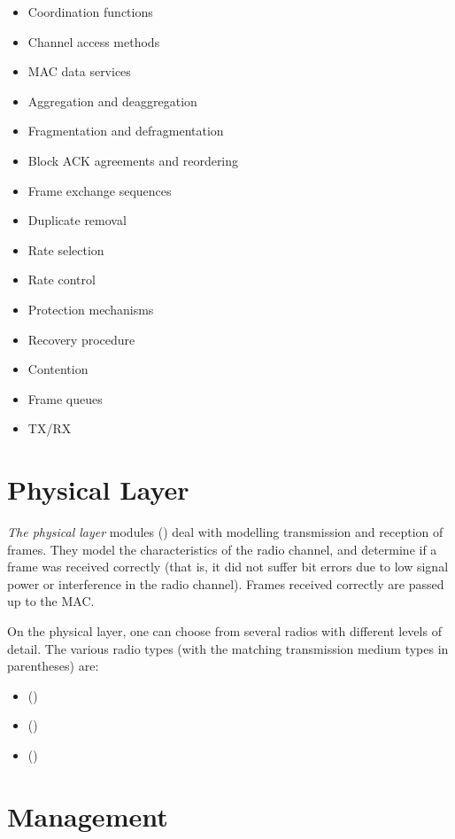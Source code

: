 \begin{itemize}
  \item Coordination functions
  \item Channel access methods
  \item MAC data services
  \item Aggregation and deaggregation
  \item Fragmentation and defragmentation
  \item Block ACK agreements and reordering
  \item Frame exchange sequences
  \item Duplicate removal
  \item Rate selection
  \item Rate control
  \item Protection mechanisms
  \item Recovery procedure
  \item Contention
  \item Frame queues
  \item TX/RX
\end{itemize}

\section{Physical Layer}
\label{sec:80211:physical-layer}

\textit{The physical layer} modules () deal with modelling
transmission and reception of frames. They model the characteristics of
the radio channel, and determine if a frame was received correctly
(that is, it did not suffer bit errors due to low signal power or
interference in the radio channel). Frames received correctly are passed
up to the MAC.

On the physical layer, one can choose from several radios with different levels
of detail. The various radio types (with the matching transmission medium types
in parentheses) are:

\begin{itemize}
  \item {} () 
  \item {} () 
  \item {} ()
\end{itemize}

\section{Management}
\label{sec:80211:management}

